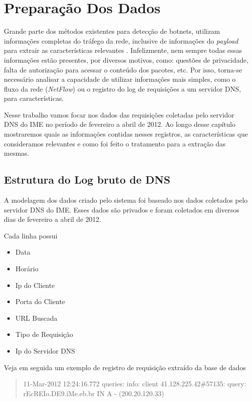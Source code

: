 \chapter{Preparação Dos Dados}
Grande parte dos métodos existentes para detecção de botnets, utilizam informações completas do tráfego da rede, inclusive de informações do \textit{payload} para extrair as características relevantes \citep{krmicek2011inspecting}. Infelizmente, nem sempre todas essas informações estão presentes, por diversos motivos, como: questões de privacidade, falta de autorização para acessar o conteúdo dos pacotes, etc. Por isso, torna-se necessário analisar a capacidade de utilizar informações mais simples, como o fluxo da rede (\textit{NetFlow}) ou o registro do log de requisições a um servidor DNS, para características.

Nesse trabalho vamos focar nos dados das requisições coletadas pelo servidor DNS do IME no período de fevereiro a abril de 2012. Ao longo desse capítulo mostraremos quais as informações contidas nesses registros, as características que consideramos relevantes e como foi feito o tratamento para a extração das mesmas.

\section{Estrutura do Log bruto de DNS }
A modelagem dos dados criado pelo sistema foi baseado nos dados coletados pelo servidor DNS do IME. Esses dados são privados e foram coletados em diversos dias de fevereiro a abril de 2012.

Cada linha possui
\begin{itemize}
\item Data
\item Horário
\item Ip do Cliente
\item Porta do Cliente
\item URL Buscada
\item Tipo de Requisição
\item Ip do Servidor DNS
\end{itemize}

Veja em seguida um exemplo de registro de requisição extraído da base de dados

\begin{quote}
11-Mar-2012 12:24:16.772 queries: info: client 41.128.225.42\#57135: query: rEcREIo.DE9.iMe.eb.br IN A - (200.20.120.33)
\end{quote}

